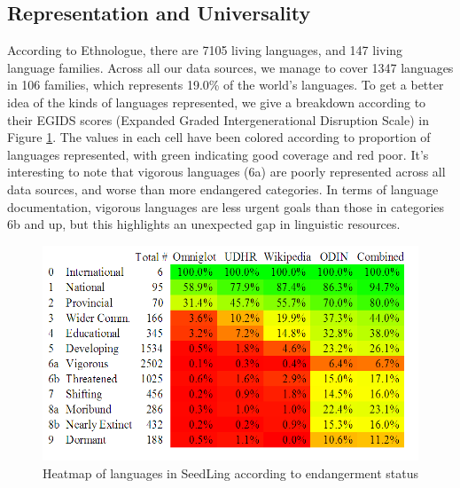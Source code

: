 \subsection{Representation and Universality} \label{sec:stats}

According to Ethnologue, there are 7105 living languages, and 147 living language families. Across all our data sources, we manage to cover 1347 languages in 106 families, which represents 19.0\% of the world's languages. To get a better idea of the kinds of languages represented, we give a breakdown according to their EGIDS scores (Expanded Graded Intergenerational Disruption Scale) \cite{lewis2010assessing} in Figure \ref{fig:heatmap}. The values in each cell have been colored according to proportion of languages represented, with green indicating good coverage and red poor. It's interesting to note that vigorous languages (6a) are poorly represented across all data sources, and worse than more endangered categories. In terms of language documentation, vigorous languages are less urgent goals than those in categories 6b and up, but this highlights an unexpected gap in linguistic resources.

\begin{figure}[t]
\begin{centering}
\includegraphics[scale=0.63]{heatmap-numbers.png}
\caption{Heatmap of languages in SeedLing according to endangerment status}\label{fig:heatmap}
\end{centering}
\end{figure}
